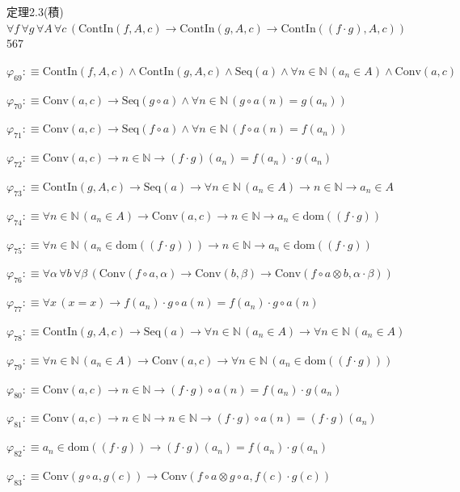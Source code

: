 \begin{fullproof}{定理2.3(積)}{$\forall f\,\forall g\,\forall A\,\forall c\,(\mathrm{ContIn}(f,A,c) \to \mathrm{ContIn}(g,A,c) \to \mathrm{ContIn}((f \cdot g),A,c))$}{567}
\begin{abbrevlist}
\item $\varphi_{69} :\equiv \mathrm{ContIn}(f,A,c) \land \mathrm{ContIn}(g,A,c) \land \mathrm{Seq}(a) \land \forall n \in \mathbb{N}\,(a_{n} \in A) \land \mathrm{Conv}(a,c)$
\item $\varphi_{70} :\equiv \mathrm{Conv}(a,c) \to \mathrm{Seq}(g \circ a) \land \forall n \in \mathbb{N}\,(g \circ a(n) = g(a_{n}))$
\item $\varphi_{71} :\equiv \mathrm{Conv}(a,c) \to \mathrm{Seq}(f \circ a) \land \forall n \in \mathbb{N}\,(f \circ a(n) = f(a_{n}))$
\item $\varphi_{72} :\equiv \mathrm{Conv}(a,c) \to n \in \mathbb{N} \to (f \cdot g)(a_{n}) = f(a_{n}) \cdot g(a_{n})$
\item $\varphi_{73} :\equiv \mathrm{ContIn}(g,A,c) \to \mathrm{Seq}(a) \to \forall n \in \mathbb{N}\,(a_{n} \in A) \to n \in \mathbb{N} \to a_{n} \in A$
\item $\varphi_{74} :\equiv \forall n \in \mathbb{N}\,(a_{n} \in A) \to \mathrm{Conv}(a,c) \to n \in \mathbb{N} \to a_{n} \in \mathrm{dom}((f \cdot g))$
\item $\varphi_{75} :\equiv \forall n \in \mathbb{N}\,(a_{n} \in \mathrm{dom}((f \cdot g))) \to n \in \mathbb{N} \to a_{n} \in \mathrm{dom}((f \cdot g))$
\item $\varphi_{76} :\equiv \forall \alpha\,\forall b\,\forall \beta\,(\mathrm{Conv}(f \circ a,\alpha) \to \mathrm{Conv}(b,\beta) \to \mathrm{Conv}(f \circ a \otimes b,\alpha \cdot \beta))$
\item $\varphi_{77} :\equiv \forall x\,(x = x) \to f(a_{n}) \cdot g \circ a(n) = f(a_{n}) \cdot g \circ a(n)$
\item $\varphi_{78} :\equiv \mathrm{ContIn}(g,A,c) \to \mathrm{Seq}(a) \to \forall n \in \mathbb{N}\,(a_{n} \in A) \to \forall n \in \mathbb{N}\,(a_{n} \in A)$
\item $\varphi_{79} :\equiv \forall n \in \mathbb{N}\,(a_{n} \in A) \to \mathrm{Conv}(a,c) \to \forall n \in \mathbb{N}\,(a_{n} \in \mathrm{dom}((f \cdot g)))$
\item $\varphi_{80} :\equiv \mathrm{Conv}(a,c) \to n \in \mathbb{N} \to (f \cdot g) \circ a(n) = f(a_{n}) \cdot g(a_{n})$
\item $\varphi_{81} :\equiv \mathrm{Conv}(a,c) \to n \in \mathbb{N} \to n \in \mathbb{N} \to (f \cdot g) \circ a(n) = (f \cdot g)(a_{n})$
\item $\varphi_{82} :\equiv a_{n} \in \mathrm{dom}((f \cdot g)) \to (f \cdot g)(a_{n}) = f(a_{n}) \cdot g(a_{n})$
\item $\varphi_{83} :\equiv \mathrm{Conv}(g \circ a,g(c)) \to \mathrm{Conv}(f \circ a \otimes g \circ a,f(c) \cdot g(c))$

\end{abbrevlist}
\end{fullproof}
